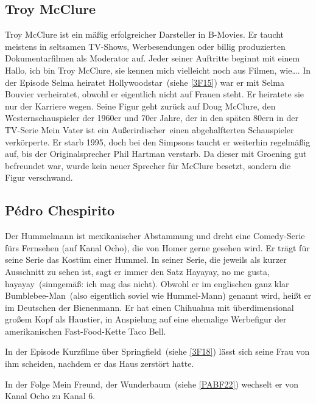 \subsection{Troy McClure}
Troy McClure ist ein mäßig erfolgreicher Darsteller in B-Movies. Er taucht meistens in seltsamen TV-Shows, Werbesendungen oder billig produzierten Dokumentarfilmen als Moderator auf. Jeder seiner Auftritte beginnt mit einem \glqq Hallo, ich bin Troy McClure, sie kennen mich vielleicht noch aus Filmen, wie\dots \grqq . In der Episode \glqq Selma heiratet Hollywoodstar\grqq\ (siehe \ref{3F15}) war er mit Selma Bouvier verheiratet, obwohl er eigentlich nicht auf Frauen steht. Er heiratete sie nur der Karriere wegen. Seine Figur geht zurück auf Doug McClure, den Westernschauspieler der 1960er und 70er Jahre, der in den späten 80ern in der TV-Serie \glqq Mein Vater ist ein Außerirdischer\grqq\ einen abgehalfterten Schauspieler verkörperte. Er starb 1995, doch bei den Simpsons taucht er weiterhin regelmäßig auf, bis der Originalsprecher Phil Hartman verstarb. Da dieser mit Groening gut befreundet war, wurde kein neuer Sprecher für McClure besetzt, sondern die Figur verschwand.

\subsection{Pédro Chespirito}\label{Hummelmann}
Der Hummelmann ist mexikanischer Abstammung und dreht eine Comedy-Serie fürs Fernsehen (auf Kanal Ocho), die von Homer gerne gesehen wird. Er trägt für seine Serie das Kostüm einer Hummel. In seiner Serie, die jeweils als kurzer Ausschnitt zu sehen ist, sagt er immer den Satz \glqq Hayayay, no me gusta, hayayay\grqq\ (sinngemäß: \glqq ich mag das nicht\grqq ). Obwohl er im englischen ganz klar \glqq Bumblebee-Man\grqq\ (also eigentlich soviel wie Hummel-Mann) genannt wird, heißt er im Deutschen \glqq der Bienenmann\grqq . Er hat einen Chihuahua mit überdimensional großem Kopf als Haustier, in Anspielung auf eine ehemalige Werbefigur der amerikanischen Fast-Food-Kette \glqq Taco Bell\grqq .

In der Episode  Kurzfilme über Springfield\grqq\ (siehe \ref{3F18}) lässt sich seine Frau von ihm scheiden, nachdem er das Haus zerstört hatte.

In der Folge \glqq Mein Freund, der Wunderbaum\grqq\ (siehe \ref{PABF22}) wechselt er von Kanal Ocho zu Kanal 6.

